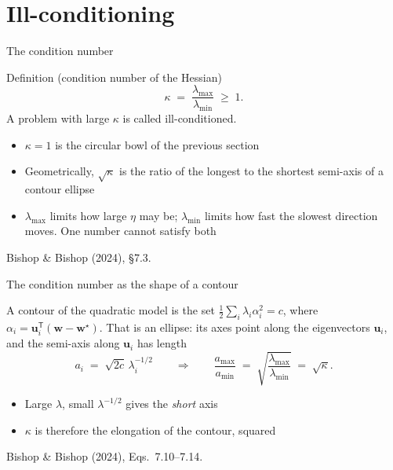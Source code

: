 \documentclass[aspectratio=169, 11pt]{beamer}
\newcommand{\srcline}[1]{%
  \par\vspace{0.25em}%
  {\scriptsize\color{mcMuted}\hfill #1\par}}
\newcommand{\src}[3]{}      %
\begin{document}
\section{Ill-conditioning}

\begin{frame}{The condition number}
  \src{bishop2024}{section}{7.3}
  \begin{block}{Definition (condition number of the Hessian)}
    \[
      \kappa \;=\; \frac{\lambda_{\max}}{\lambda_{\min}} \;\geq\; 1 .
    \]
    A problem with large $\kappa$ is called \alert{ill-conditioned}.
  \end{block}
  \vspace{0.4em}
  \begin{itemize}\itemsep0.4em
    \item $\kappa = 1$ is the circular bowl of the previous section
    \item Geometrically, $\sqrt{\kappa}$ is the ratio of the longest to
          the shortest semi-axis of a contour ellipse
    \item $\lambda_{\max}$ limits how large $\eta$ may be;
          $\lambda_{\min}$ limits how fast the slowest direction moves.
          One number cannot satisfy both
  \end{itemize}
  \srcline{Bishop \& Bishop (2024), \S7.3.}
\end{frame}

\begin{frame}{The condition number as the shape of a contour}
  \src{bishop2024}{figure}{7.2}
  \src{bishop2024}{equation}{7.10-7.14}
  \src{bishop2024}{section}{7.1.1}
  \vspace{-0.1em}
  A contour of the quadratic model is the set
  $\tfrac12\sum_i \lambda_i \alpha_i^2 = c$, where
  $\alpha_i = \mathbf{u}_i^{\mathsf T}(\mathbf{w}-\mathbf{w}^\star)$.
  That is an \alert{ellipse}: its axes point along the eigenvectors
  $\mathbf{u}_i$, and the semi-axis along $\mathbf{u}_i$ has length
  \[
    a_i \;=\; \sqrt{2c}\,\lambda_i^{-1/2}
    \qquad\Longrightarrow\qquad
    \frac{a_{\max}}{a_{\min}}
      \;=\; \sqrt{\frac{\lambda_{\max}}{\lambda_{\min}}}
      \;=\; \sqrt{\kappa}.
  \]
  \vspace{-0.4em}
  \begin{itemize}\itemsep0.35em
    \item  Large $\lambda$, small $\lambda^{-1/2}$ gives the \emph{short} axis
          
    \item $\kappa$ is therefore the elongation of the contour, squared
  \end{itemize}
  \srcline{Bishop \& Bishop (2024), Eqs.~7.10--7.14.}
\end{frame}
\end{document}
